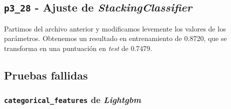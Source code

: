 \documentclass[a4paper, 20pt]{article}
\begin{document}
\subsection{\texttt{p3\_28} - Ajuste de \textit{StackingClassifier}}

Partimos del archivo anterior y modificamos levemente los valores de los parámetros. Obtenemos un resultado en entrenamiento de 0.8720, que se transforma en una puntuación en \textit{test} de 0.7479.






\subsection{Pruebas fallidas}

\subsubsection{\texttt{categorical\_features} de \textit{Lightgbm}}
\end{document}
